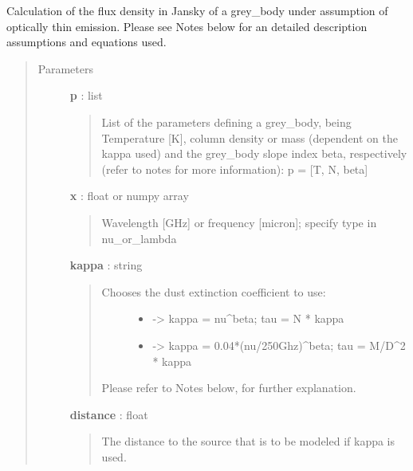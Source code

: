 \documentclass[a4paper,10pt,english]{sphinxmanual}
\begin{document}
\begin{fulllineitems}
\label{functions:astrolyze.functions.astro_functions.grey_body}
Calculation of the flux density in Jansky of a grey\_body under
assumption of optically thin emission. Please see Notes below for an
detailed description assumptions and equations used.
\begin{quote}\begin{description}
\item[{Parameters }] \leavevmode
\textbf{p} : list
\begin{quote}

List of the parameters defining a grey\_body, being Temperature {[}K{]},
column density or mass (dependent on the kappa used) and the grey\_body
slope index beta, respectively (refer to notes for more information):
p = {[}T, N, beta{]}
\end{quote}

\textbf{x} : float or numpy array
\begin{quote}

Wavelength {[}GHz{]} or frequency {[}micron{]};
specify type in nu\_or\_lambda
\end{quote}

\textbf{kappa} : string
\begin{quote}
\begin{description}
\item[{Chooses the dust extinction coefficient to use:}] \leavevmode\begin{itemize}
\item {} 
 -\textgreater{} kappa = nu\textasciicircum{}beta; tau = N * kappa

\item {} 
 -\textgreater{} kappa = 0.04*(nu/250Ghz)\textasciicircum{}beta;
tau = M/D\textasciicircum{}2 * kappa

\end{itemize}

\end{description}

Please refer to Notes below, for further explanation.
\end{quote}

\textbf{distance} : float
\begin{quote}

The distance to the source that is to be modeled if kappa
 is used.
\end{quote}


\end{description}
\end{quote}
\end{fulllineitems}
\end{document}
